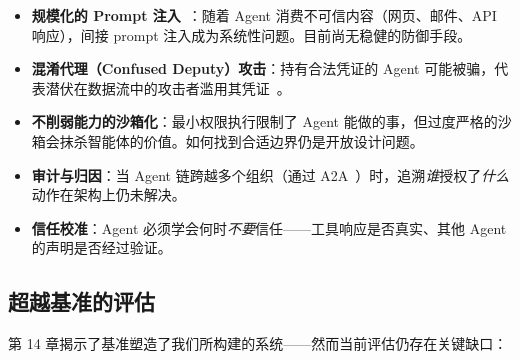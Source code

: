 \begin{itemize}
  \item \textbf{规模化的 Prompt 注入}~\cite{greshake2023indirect}：随着 Agent 消费不可信内容（网页、邮件、API 响应），间接 prompt 注入成为系统性问题。目前尚无稳健的防御手段。
  \item \textbf{混淆代理（Confused Deputy）攻击}：持有合法凭证的 Agent 可能被骗，代表潜伏在数据流中的攻击者滥用其凭证~\cite{anthropic-mcp-2024}。
  \item \textbf{不削弱能力的沙箱化}：最小权限执行限制了 Agent 能做的事，但过度严格的沙箱会抹杀智能体的价值。如何找到合适边界仍是开放设计问题。
  \item \textbf{审计与归因}：当 Agent 链跨越多个组织（通过 A2A~\cite{google-a2a-2025}）时，追溯\emph{谁}授权了\emph{什么}动作在架构上仍未解决。
  \item \textbf{信任校准}：Agent 必须学会何时\emph{不要}信任——工具响应是否真实、其他 Agent 的声明是否经过验证。
\end{itemize}

\subsection{超越基准的评估}
\label{evaluation-beyond-benchmarks}

第 14 章揭示了基准塑造了我们所构建的系统——然而当前评估仍存在关键缺口：

